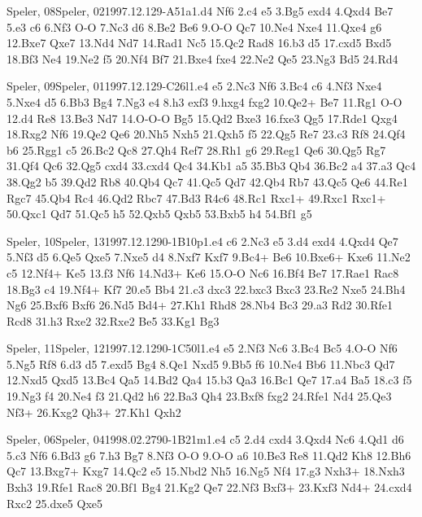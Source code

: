 \documentclass[twocolumn,a4paper,10pt]{report}
\begin{document}
\begin{chessgame}{Speler, 08}{Speler, 02}{1997.12.12}{9}{\textonehalf-\textonehalf}{A51a}{1.d4 Nf6 2.c4 e5 3.Bg5 exd4 4.Qxd4 Be7 5.e3 c6 6.Nf3 O-O 7.Nc3 d6 8.Be2 Be6 9.O-O Qc7 10.Ne4 Nxe4 11.Qxe4 g6 12.Bxe7 Qxe7 13.Nd4 Nd7 14.Rad1 Nc5 15.Qc2 Rad8 16.b3 d5 17.cxd5 Bxd5 18.Bf3 Ne4 19.Ne2 f5 20.Nf4 Bf7 21.Bxe4 fxe4 22.Ne2 Qe5 23.Ng3 Bd5 24.Rd4}\end{chessgame}
\begin{chessgame}{Speler, 09}{Speler, 01}{1997.12.12}{9}{\textonehalf-\textonehalf}{C26l}{1.e4 e5 2.Nc3 Nf6 3.Bc4 c6 4.Nf3 Nxe4 5.Nxe4 d5 6.Bb3 Bg4 7.Ng3 e4 8.h3 exf3 9.hxg4 fxg2 10.Qe2+ Be7 11.Rg1 O-O 12.d4 Re8 13.Be3 Nd7 14.O-O-O Bg5 15.Qd2 Bxe3 16.fxe3 Qg5 17.Rde1 Qxg4 18.Rxg2 Nf6 19.Qe2 Qe6 20.Nh5 Nxh5 21.Qxh5 f5 22.Qg5 Re7 23.c3 Rf8 24.Qf4 b6 25.Rgg1 c5 26.Bc2 Qc8 27.Qh4 Ref7 28.Rh1 g6 29.Reg1 Qe6 30.Qg5 Rg7 31.Qf4 Qc6 32.Qg5 cxd4 33.cxd4 Qc4 34.Kb1 a5 35.Bb3 Qb4 36.Bc2 a4 37.a3 Qc4 38.Qg2 b5 39.Qd2 Rb8 40.Qb4 Qc7 41.Qc5 Qd7 42.Qb4 Rb7 43.Qc5 Qe6 44.Re1 Rgc7 45.Qb4 Rc4 46.Qd2 Rbc7 47.Bd3 R4c6 48.Rc1 Rxc1+ 49.Rxc1 Rxc1+ 50.Qxc1 Qd7 51.Qc5 h5 52.Qxb5 Qxb5 53.Bxb5 h4 54.Bf1 g5}\end{chessgame}
\begin{chessgame}{Speler, 10}{Speler, 13}{1997.12.12}{9}{0-1}{B10p}{1.e4 c6 2.Nc3 e5 3.d4 exd4 4.Qxd4 Qe7 5.Nf3 d5 6.Qe5 Qxe5 7.Nxe5 d4 8.Nxf7 Kxf7 9.Bc4+ Be6 10.Bxe6+ Kxe6 11.Ne2 c5 12.Nf4+ Ke5 13.f3 Nf6 14.Nd3+ Ke6 15.O-O Nc6 16.Bf4 Be7 17.Rae1 Rac8 18.Bg3 c4 19.Nf4+ Kf7 20.e5 Bb4 21.c3 dxc3 22.bxc3 Bxc3 23.Re2 Nxe5 24.Bh4 Ng6 25.Bxf6 Bxf6 26.Nd5 Bd4+ 27.Kh1 Rhd8 28.Nb4 Bc3 29.a3 Rd2 30.Rfe1 Rcd8 31.h3 Rxe2 32.Rxe2 Be5 33.Kg1 Bg3}\end{chessgame}
\begin{chessgame}{Speler, 11}{Speler, 12}{1997.12.12}{9}{0-1}{C50l}{1.e4 e5 2.Nf3 Nc6 3.Bc4 Bc5 4.O-O Nf6 5.Ng5 Rf8 6.d3 d5 7.exd5 Bg4 8.Qe1 Nxd5 9.Bb5 f6 10.Ne4 Bb6 11.Nbc3 Qd7 12.Nxd5 Qxd5 13.Bc4 Qa5 14.Bd2 Qa4 15.b3 Qa3 16.Bc1 Qe7 17.a4 Ba5 18.c3 f5 19.Ng3 f4 20.Ne4 f3 21.Qd2 h6 22.Ba3 Qh4 23.Bxf8 fxg2 24.Rfe1 Nd4 25.Qe3 Nf3+ 26.Kxg2 Qh3+ 27.Kh1 Qxh2\mate}\end{chessgame}
\begin{chessgame}{Speler, 06}{Speler, 04}{1998.02.27}{9}{0-1}{B21m}{1.e4 c5 2.d4 cxd4 3.Qxd4 Nc6 4.Qd1 d6 5.c3 Nf6 6.Bd3 g6 7.h3 Bg7 8.Nf3 O-O 9.O-O a6 10.Be3 Re8 11.Qd2 Kh8 12.Bh6 Qc7 13.Bxg7+ Kxg7 14.Qc2 e5 15.Nbd2 Nh5 16.Ng5 Nf4 17.g3 Nxh3+ 18.Nxh3 Bxh3 19.Rfe1 Rac8 20.Bf1 Bg4 21.Kg2 Qe7 22.Nf3 Bxf3+ 23.Kxf3 Nd4+ 24.cxd4 Rxc2 25.dxe5 Qxe5}\end{chessgame}
\end{document}
